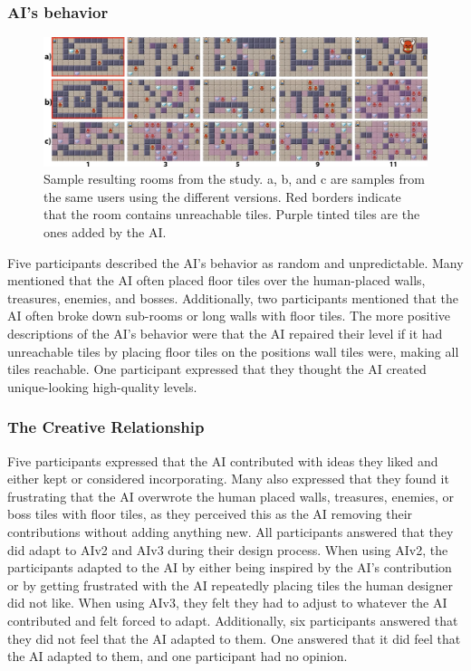\subsubsection{AI's behavior}

\begin{figure}[h]
 \includegraphics[width=\textwidth]{images/rooms-designed-1.png}
 \caption{Sample resulting rooms from the study. a, b, and c are samples from the same users using the different versions. Red borders indicate that the room contains unreachable tiles. Purple tinted tiles are the ones added by the AI.}
 \label{fig:userdesigned-rooms}
\end{figure}

Five participants described the AI's behavior as random and unpredictable. Many mentioned that the AI often placed floor tiles over the human-placed walls, treasures, enemies, and bosses. Additionally, two participants mentioned that the AI often broke down sub-rooms or long walls with floor tiles. The more positive descriptions of the AI's behavior were that the AI repaired their level if it had unreachable tiles by placing floor tiles on the positions wall tiles were, making all tiles reachable. One participant expressed that they thought the AI created unique-looking high-quality levels.

\subsubsection{The Creative Relationship}

Five participants expressed that the AI contributed with ideas they liked and either kept or considered incorporating. Many also expressed that they found it frustrating that the AI overwrote the human placed walls, treasures, enemies, or boss tiles with floor tiles, as they perceived this as the AI removing their contributions without adding anything new. All participants answered that they did adapt to AIv2 and AIv3 during their design process. When using AIv2, the participants adapted to the AI by either being inspired by the AI's contribution or by getting frustrated with the AI repeatedly placing tiles the human designer did not like. When using AIv3, they felt they had to adjust to whatever the AI contributed and felt forced to adapt. Additionally, six participants answered that they did not feel that the AI adapted to them. One answered that it did feel that the AI adapted to them, and one participant had no opinion. 


